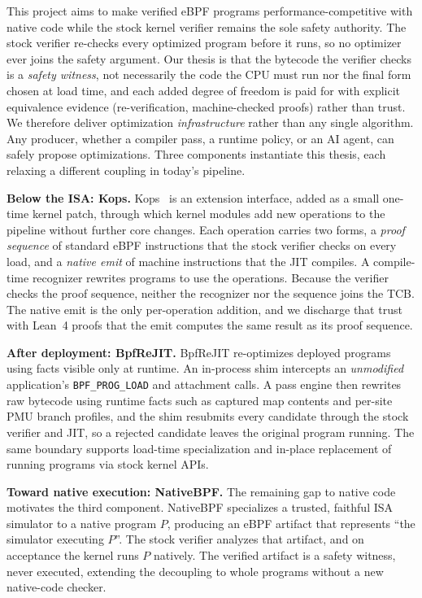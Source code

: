 This project aims to make verified eBPF programs performance-competitive with native code while the stock kernel verifier remains the sole safety authority. The stock verifier re-checks every optimized program before it runs, so no optimizer ever joins the safety argument.  Our thesis is that the bytecode the verifier checks is a \emph{safety witness}, not necessarily the code the CPU must run nor the final form chosen at load time, and each added degree of freedom is paid for with explicit equivalence evidence (re-verification, machine-checked proofs) rather than trust.  We therefore deliver optimization \emph{infrastructure} rather than any single algorithm. Any producer, whether a compiler pass, a runtime policy, or an AI agent, can safely propose optimizations.  Three components instantiate this thesis, each relaxing a different coupling in today's pipeline.

\noindent\textbf{Below the ISA: Kops.}  Kops~\cite{zheng2026kops} is an extension interface, added as a small one-time kernel patch, through which kernel modules add new operations to the pipeline without further core changes.  Each operation carries two forms, a \emph{proof sequence} of standard eBPF instructions that the stock verifier checks on every load, and a \emph{native emit} of machine instructions that the JIT compiles.  A compile-time recognizer rewrites programs to use the operations. Because the verifier checks the proof sequence, neither the recognizer nor the sequence joins the TCB. The native emit is the only per-operation addition, and we discharge that trust with Lean~4 proofs that the emit computes the same result as its proof sequence.

\noindent\textbf{After deployment: BpfReJIT.}  BpfReJIT re-optimizes deployed programs using facts visible only at runtime.  An in-process shim intercepts an \emph{unmodified} application's \texttt{BPF\_PROG\_LOAD} and attachment calls. A pass engine then rewrites raw bytecode using runtime facts such as captured map contents and per-site PMU branch profiles, and the shim resubmits every candidate through the stock verifier and JIT, so a rejected candidate leaves the original program running.  The same boundary supports load-time specialization and in-place replacement of running programs via stock kernel APIs.

\noindent\textbf{Toward native execution: NativeBPF.}  The remaining gap to native code motivates the third component. NativeBPF specializes a trusted, faithful ISA simulator to a native program $P$, producing an eBPF artifact that represents ``the simulator executing $P$''. The stock verifier analyzes that artifact, and on acceptance the kernel runs $P$ natively. The verified artifact is a safety witness, never executed, extending the decoupling to whole programs without a new native-code checker.

